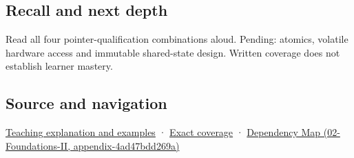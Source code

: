 \subsection{Recall and next depth}\label{appendix-c25d60fed375-recall-and-next-depth}

Read all four pointer-qualification combinations aloud. Pending: atomics, volatile hardware access and immutable shared-state design. Written coverage does not establish learner mastery.

\subsection{Source and navigation}\label{appendix-c25d60fed375-source-and-navigation}

\hyperref[01-foundations-i-ch003-read-only-is-a-path-not-an-ownership-or-synchronization-promise]{Teaching explanation and examples} · \hyperref[appendix-fd090d982a15-m008---parts-113-126]{Exact coverage} · \href{../02-Foundations-II/main.pdf\#nameddest=appendix-4ad47bdd269a}{Dependency Map (02-Foundations-II, appendix-4ad47bdd269a)}
